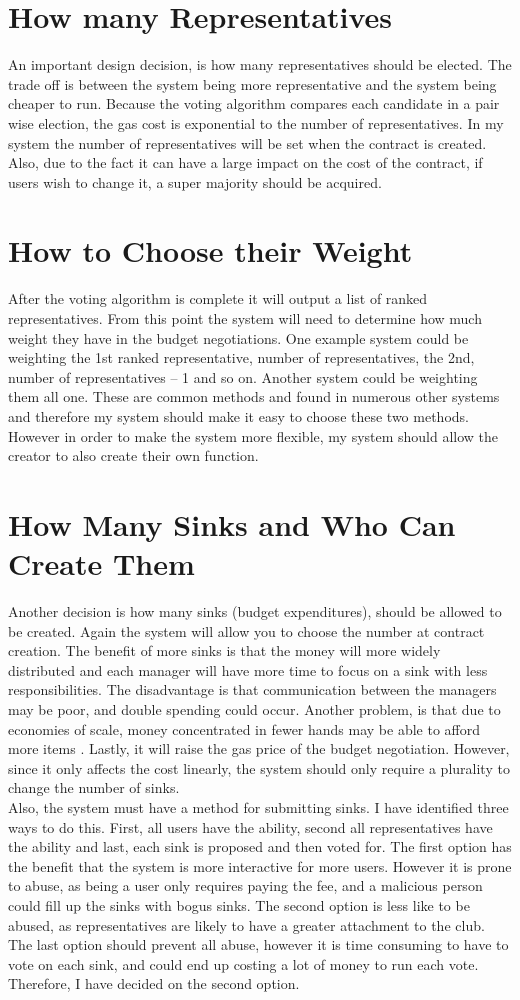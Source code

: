 \section{How many Representatives}
An important design decision, is how many representatives should be elected. The trade off is between the system being more representative and the system being cheaper to run. Because the voting algorithm compares each candidate in a pair wise election, the gas cost is exponential to the number of representatives. In my system the number of representatives will be set when the contract is created. Also, due to the fact it can have a large impact on the cost of the contract, if users wish to change it, a super majority should be acquired.
\section{How to Choose their Weight}
After the voting algorithm is complete it will output a list of ranked representatives. From this point the system will need to determine how much weight they have in the budget negotiations. One example system  could be weighting the 1st ranked representative, number of representatives, the 2nd, number of representatives – 1 and so on. Another system could be weighting them all one. These are common methods and found in numerous other systems and therefore my system should make it easy to choose these two methods. However in order to make the system more flexible, my system should allow the creator to also create their own function.
\section{How Many Sinks and Who Can Create Them}
Another decision is how many sinks (budget expenditures), should be allowed to be created. Again the system will allow you to choose the number at contract creation. The benefit of more sinks is that the money will more widely distributed and each manager will have more time to focus on a sink with less responsibilities. The disadvantage is that communication between the managers may be poor, and double spending could occur. Another problem, is that due to economies of scale, money concentrated in fewer hands may be able to afford more items . Lastly, it will raise the gas price of the budget negotiation. However, since it only affects the cost linearly, the system should only require a plurality to change the number of sinks.
\\
Also, the system must have a method for submitting sinks. I have identified three ways to do this. First, all users have the ability, second all representatives have the ability and last, each sink is proposed and then voted for. The first option has the benefit that the system is more interactive for more users. However it is prone to abuse, as being a user only requires paying the fee, and a malicious person could fill up the sinks with bogus sinks.  The second option is less like to be abused, as representatives are likely to have a greater attachment to the club. The last option should prevent all abuse, however it is time consuming to have to vote on each sink, and could end up costing a lot of money to run each vote. Therefore, I have decided on the second option.
